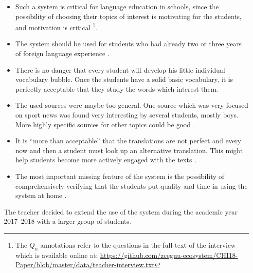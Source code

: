 \begin{itemize}

	\item Such a system is critical for language education in schools, since the possibility of choosing their topics of interest is motivating for the students, and motivation is critical \footnote{The $Q_n$ annotations refer to the questions in the full text of the interview which is available online at: \url{https://github.com/zeeguu-ecosystem/CHI18-Paper/blob/master/data/teacher-interview.txt}}. 

	\item The system should be used for students who had already two or three years of foreign language experience . 

	\item There is no danger that every student will develop his little individual vocabulary bubble. Once the students have a solid basic vocabulary, it is perfectly acceptable that they study the words which interest them. 

	\item The used sources were maybe too general. One source which was very focused on sport news was found very interesting by several students, mostly boys. More highly specific sources for other topics could be good .



	\item It is ``more than acceptable'' that the translations are not perfect and every now and then a student must look up an alternative translation. This might help students become more actively engaged with the texts . 


	\item The most important missing feature of the system is the possibility of comprehensively verifying that the students put quality and time in using the system at home .

\end{itemize}


The teacher decided to extend the use of the system during the academic year 2017--2018 with a larger group of students. 
